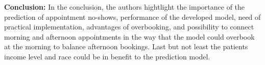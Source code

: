     \textbf{Conclusion:}
    In the conclusion, the authors hightlight the importance of the prediction of appointment no-shows, performance of the developed model, need of practical implementation, advantages of overbooking, and possibility to connect morning and afternoon appointments in the way that the model could overbook at the morning to balance afternoon bookings. Last but not least the patients income level and race could be in benefit to the prediction model.
